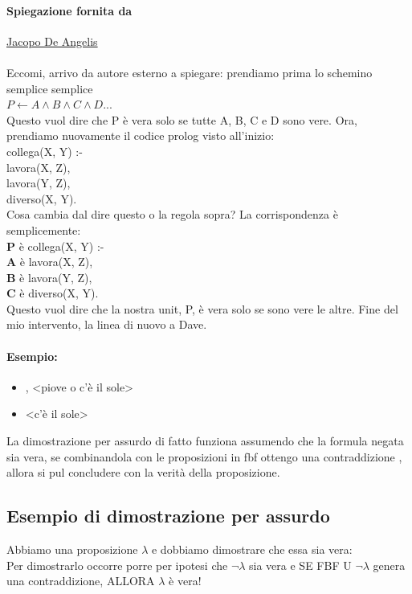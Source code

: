\documentclass[12pt, a4paper, openany, oneside]{book}
\newcommand\tab[1][1cm]{\hspace*{#1}}
\begin{document}
\paragraph{Spiegazione fornita da } \href{https://github.com/JacopoDeAngelis}
{Jacopo De Angelis} \\ \\
Eccomi, arrivo da autore esterno a spiegare: prendiamo prima lo schemino semplice
semplice \\
$ P \leftarrow A \wedge B \wedge C \wedge D ...$ \\
Questo vuol dire che P è vera solo se tutte A, B, C e D sono vere. Ora, prendiamo 
nuovamente il codice prolog visto all'inizio: \\
\color{red}
collega(X, Y) :-  \\	
\tab lavora(X, Z), \\	
\tab lavora(Y, Z), \\	
\tab diverso(X, Y). \color{black}\\
Cosa cambia dal dire questo o la regola sopra? La corrispondenza è semplicemente: \\
\color{red}
\textbf{P} è collega(X, Y) :-  \\	
\tab \textbf{A} è lavora(X, Z), \\	
\tab \textbf{B} è lavora(Y, Z), \\	
\tab \textbf{C} è diverso(X, Y). \color{black}\\
Questo vuol dire che la nostra unit, P, è vera solo se sono vere le altre. Fine 
del mio intervento, la linea di nuovo a Dave.
\paragraph{Esempio:} 
\begin{itemize}
	\item <non piove>, <piove o c'è il sole>
	\item <c'è il sole>
\end{itemize}
La dimostrazione per assurdo di fatto funziona assumendo che la formula negata
sia vera, se combinandola con le proposizioni in fbf ottengo una contraddizione
, allora si pul concludere con la verità della proposizione.
\subsection{Esempio di dimostrazione per assurdo}
Abbiamo una proposizione $\lambda$ e dobbiamo dimostrare che essa sia vera: \\
Per dimostrarlo occorre porre per ipotesi che $\neg \lambda$ sia vera e 
\color{red}SE \color{black} FBF U {$\neg \lambda$} genera una contraddizione,
\color{red}ALLORA \color{black} $\lambda$ è vera!
\end{document}
